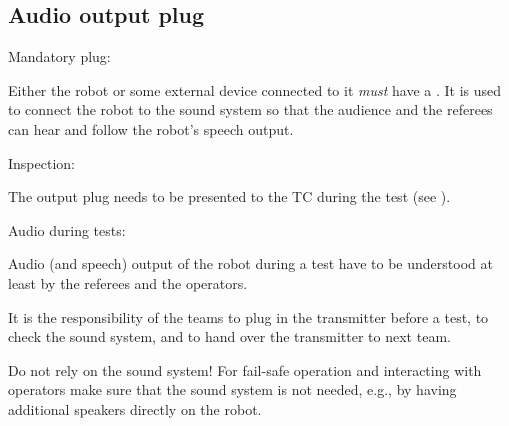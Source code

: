 \subsection{Audio output plug}\label{rule:roobt_audio_out}

\begin{enumerate}
{\bf\item Mandatory plug:} Either the robot or some external device connected to it \emph{must} have a . 
It is used to connect the robot to the sound system so that the audience and the referees can hear and follow the robot's speech output.
{\bf\item Inspection:} The output plug needs to be presented to the TC during the  test (see ).
{\bf\item Audio during tests:} Audio (and speech) output of the robot during a test have to be understood at least by the referees and the operators.
\begin{compactitem}
\item It is the responsibility of the teams to plug in the transmitter before a test, 
to check the sound system, 
and to hand over the transmitter to next team.
\item Do not rely on the sound system! 
For fail-safe operation and interacting with operators make sure that the sound system is not needed, e.g., 
by having additional speakers directly on the robot.
\end{compactitem}
\end{enumerate}

